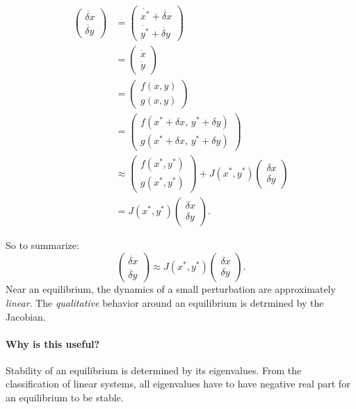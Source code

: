 \begin{align*}
  \begin{pmatrix}\dot{\delta x}\\ \dot{\delta y}\end{pmatrix}
  &= \begin{pmatrix}\dot{x^*} + \dot{\delta x}\\ \dot{y^*} + \dot{\delta y}\end{pmatrix} \\
  &= \begin{pmatrix}\dot x\\ \dot y\end{pmatrix} \\
  &= \begin{pmatrix}f(x,y)\\ g(x,y)\end{pmatrix} \\
  &= \begin{pmatrix}f(x^*+\delta x,\,y^*+\delta y)\\ g(x^*+\delta x,\,y^*+\delta y)\end{pmatrix} \\
  &\approx \begin{pmatrix}f(x^*,y^*)\\ g(x^*,y^*)\end{pmatrix}
    + J(x^*,y^*)\begin{pmatrix}\delta x\\ \delta y\end{pmatrix} \\
  &= J(x^*,y^*)\begin{pmatrix}\delta x\\ \delta y\end{pmatrix}.
\end{align*}

So to summarize:
\[
\begin{pmatrix} \dot{\delta x} \\ \dot{\delta y} \end{pmatrix}
\approx J(x^*,y^*)
\begin{pmatrix} \delta x \\ \delta y \end{pmatrix}.
\]
Near an equilibrium, the dynamics of a small perturbation are
approximately \emph{linear}. The \emph{qualitative} behavior around an
equilibrium is detrmined by the Jacobian.

\paragraph{Why is this useful?}
Stability of an equilibrium is determined by its eigenvalues. From the
classification of linear systems, all eigenvalues have to have negative
real part for an equilibrium to be stable.


